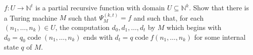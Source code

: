 $f: U \to \mathbb{N}^t$ is a partial recursive function with domain $U \subseteq \mathbb{N}^k$. Show that there is a Turing machine $M$ such that $\Psi_M^{(k, t)} = f$ and such that, for each $(n_1, \ldots, n_k) \in U$, the computation $d_0, d_1, \ldots, d_t$ by $M$ which begins with $d_0 = q_0 \operatorname{code}(n_1, \ldots, n_k)$ ends with $d_t = q \operatorname{code} f(n_1, \ldots, n_k)$ for some internal state $q$ of $M$.
